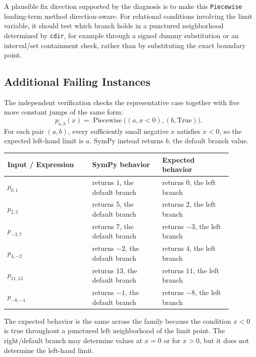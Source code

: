 \documentclass[11pt]{article}
\begin{document}
A plausible fix direction supported by the diagnosis is to make this
\texttt{Piecewise} leading-term method direction-aware.  For relational
conditions involving the limit variable, it should test which branch holds in a
punctured neighborhood determined by \texttt{cdir}, for example through a
signed dummy substitution or an interval/set containment check, rather than by
substituting the exact boundary point.

\subsection{Additional Failing Instances}

The independent verification checks the representative case together with five
more constant jumps of the same form:
\[
  p_{a,b}(x)=\operatorname{Piecewise}\bigl((a,x<0),(b,\mathrm{True})\bigr).
\]
For each pair \((a,b)\), every sufficiently small negative \(x\) satisfies
\(x<0\), so the expected left-hand limit is \(a\).  SymPy instead returns \(b\),
the default branch value.

\begin{center}
\footnotesize
\renewcommand{\arraystretch}{1.3}
\begin{tabular}{@{}>{\raggedright\arraybackslash}p{0.34\linewidth}>{\raggedright\arraybackslash}p{0.28\linewidth}>{\raggedright\arraybackslash}p{0.28\linewidth}@{}}
\toprule
\textbf{Input / Expression} & \textbf{SymPy behavior} & \textbf{Expected behavior} \\
\midrule
\(p_{0,1}\) & returns \(1\), the default branch & returns \(0\), the left branch \\
\(p_{2,5}\) & returns \(5\), the default branch & returns \(2\), the left branch \\
\(p_{-3,7}\) & returns \(7\), the default branch & returns \(-3\), the left branch \\
\(p_{4,-2}\) & returns \(-2\), the default branch & returns \(4\), the left branch \\
\(p_{11,13}\) & returns \(13\), the default branch & returns \(11\), the left branch \\
\(p_{-8,-1}\) & returns \(-1\), the default branch & returns \(-8\), the left branch \\
\bottomrule
\end{tabular}
\end{center}

The expected behavior is the same across the family because the condition
\(x<0\) is true throughout a punctured left neighborhood of the limit point.
The right/default branch may determine values at \(x=0\) or for \(x>0\), but it
does not determine the left-hand limit.
\end{document}
